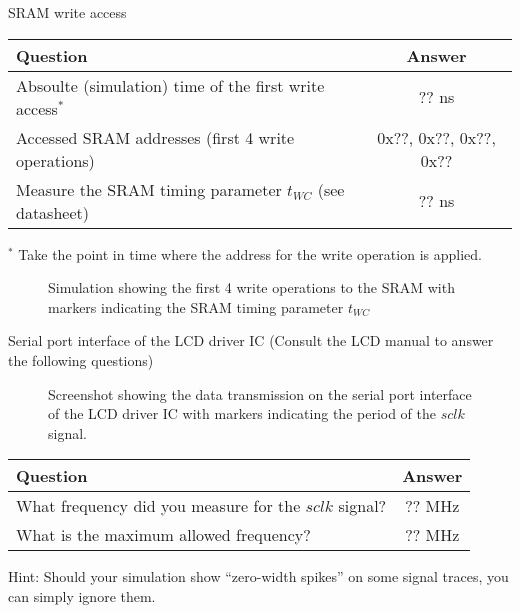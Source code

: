 \documentclass[10pt,a4paper,titlepage,oneside]{article}
\begin{document}
\begin{qa}{SRAM write access}

\begin{center}
\begin{tabular}{lc}
	\hline
	Question & Answer \\
	\hline\hline
	Absoulte (simulation) time of the first write access$^{*}$ & ?? ns \\
	Accessed SRAM addresses (first 4 write operations)         & 0x??, 0x??, 0x??, 0x?? \\
	Measure the SRAM timing parameter $t_{WC}$ (see datasheet) & ?? ns\\\hline
\end{tabular}

\footnotesize{$^{*}$ Take the point in time where the address for the write operation is applied.}
\end{center}

\begin{figure}[h!]
	\centering
	\dummyimage
	\caption{Simulation showing the first 4 write operations to the SRAM with markers indicating the SRAM timing parameter $t_{WC}$}
\end{figure}

\end{qa}

\begin{qa}{Serial port interface of the LCD driver IC (Consult the LCD manual to answer the following questions)}

\begin{figure}[h!]
	\centering
	\dummyimage
	\caption{Screenshot showing the data transmission on the serial port interface of the LCD driver IC with markers indicating the period of the $sclk$ signal.}
\end{figure}

\begin{center}
\begin{tabular}{lc}
	\hline
	Question                                               & Answer \\\hline\hline
	What frequency did you measure for the $sclk$ signal?  & ?? MHz \\
	What is the maximum allowed frequency?                 & ?? MHz \\\hline
\end{tabular}
\end{center}

Hint: Should your simulation show ``zero-width spikes'' on some signal traces, you can simply ignore them.
\end{qa}
\end{document}
